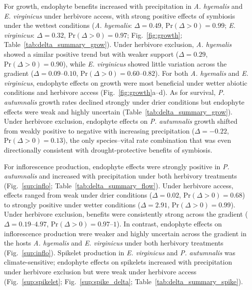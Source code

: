 \documentclass[12pt]{article}\usepackage[]{graphicx}\usepackage[dvipsnames]{xcolor}
\begin{document}
For growth, endophyte benefits increased with precipitation in \textit{A. hyemalis} and \textit{E. virginicus} under herbivore access, with strong positive effects of symbiosis under the wettest conditions (\textit{A. hyemalis}: $\Delta = 0.49$, $\mathrm{Pr}(\Delta > 0) = 0.99$; \textit{E. virginicus}: $\Delta = 0.32$, $\mathrm{Pr}(\Delta > 0) = 0.97$; Fig.~\ref{fig:growth}; Table~\ref{tab:delta_summary_grow}). 
Under herbivore exclusion, \textit{A. hyemalis} showed a similar positive trend but with weaker support ($\Delta = 0.29$, $\mathrm{Pr}(\Delta > 0) = 0.90$), while \textit{E. virginicus} showed little variation across the gradient ($\Delta = 0.09$--$0.10$, $\mathrm{Pr}(\Delta > 0) = 0.60$--$0.82$). 
For both \textit{A. hyemalis} and \textit{E. virginicus}, endophyte effects on growth were most beneficial under wetter abiotic conditions and herbivore access (Fig.~\ref{fig:growth}a--d). 
As for survival, \textit{P. autumnalis} growth rates declined strongly under drier conditions but endophyte effects were weak and highly uncertain (Table~\ref{tab:delta_summary_grow}). 
Under herbivore exclusion, endophyte effects on \textit{P. autumnalis} growth shifted from weakly positive to negative with increasing precipitation ($\Delta = -0.22$, $\mathrm{Pr}(\Delta > 0) = 0.13$), the only species–vital rate combination that was even directionally consistent with drought-protective benefits of symbiosis.

For inflorescence production, endophyte effects were strongly positive in \textit{P. autumnalis} and increased with precipitation under both herbivory treatments (Fig.~\ref{sup:inflo}; Table~\ref{tab:delta_summary_flow}). 
Under herbivore access, effects ranged from weak under drier conditions ($\Delta = 0.02$, $\mathrm{Pr}(\Delta > 0) = 0.68$) to strongly positive under wetter conditions ($\Delta = 2.91$, $\mathrm{Pr}(\Delta > 0) = 0.99$). 
Under herbivore exclusion, benefits were consistently strong across the gradient ($\Delta = 0.19$--$4.97$, $\mathrm{Pr}(\Delta > 0) = 0.97$--$1$). 
In contrast, endophyte effects on inflorescence production were weaker and highly uncertain across the gradient in the hosts \textit{A. hyemalis} and \textit{E. virginicus} under both herbivory treatments (Fig.~\ref{sup:inflo}). 
Spikelet production in \textit{E. virginicus} and \textit{P. autumnalis} was climate-sensitive; endophyte effects on spikelets increased with precipitation under herbivore exclusion but were weak under herbivore access (Fig.~\ref{sup:spikelet}; Fig.~\ref{sup:spike_delta}; Table~\ref{tab:delta_summary_spike}).
\end{document}

